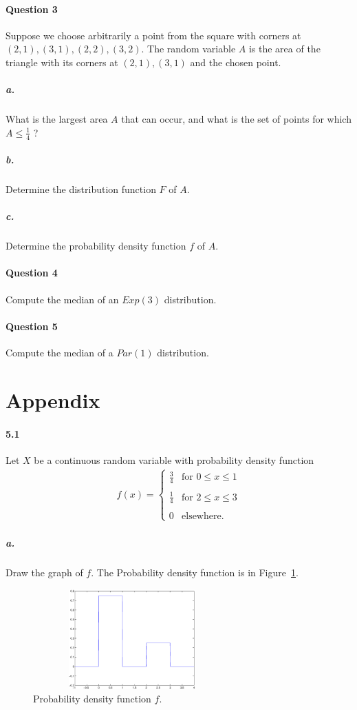 \documentclass[11pt]{article} %
\begin{document}
\paragraph*{\bf Question 3}Suppose we choose arbitrarily a point from the square with corners at $(2, 1), (3, 1), (2, 2), (3, 2)$. The random variable $A$ is the area of the triangle with its corners at $(2, 1), (3, 1)$ and the chosen point. 

\subparagraph*{a.} What is the largest area $A$ that can occur, and what is the set of points for which $A \leq \frac{1}{4}$ ?
\subparagraph*{b.} Determine the distribution function $F$ of $A$. 
\subparagraph*{c.} Determine the probability density function $f$ of $A$.
\paragraph*{\bf Question 4}
Compute the median of an $Exp(3)$ distribution. 
\paragraph*{\bf Question 5}
 Compute the median of a $Par(1)$ distribution. 
\newpage

\section*{\bf Appendix}
\paragraph*{5.1} Let $X$ be a continuous random variable with probability density function\\
\begin{align*}
f(x) = \left\lbrace
\begin{array}{ll} 
\frac{3}{4} & \text{for } 0 \leq x \leq 1 \\
& \\
\frac{1}{4} & \text{for } 2 \leq x \leq 3 \\ 
& \\
0 & \text{elsewhere.}
\end{array}
\right.
\end{align*}

\subparagraph*{a.} Draw the graph of $f$.
The Probability density function is in Figure~\ref{Fig:ch0501a}.
\begin{figure}[h!]
\centering
\includegraphics[width=3in, height=1.5in]{ch0501a.eps}
\caption{Probability density function $f$.}
\label{Fig:ch0501a}
\end{figure}
\end{document}
